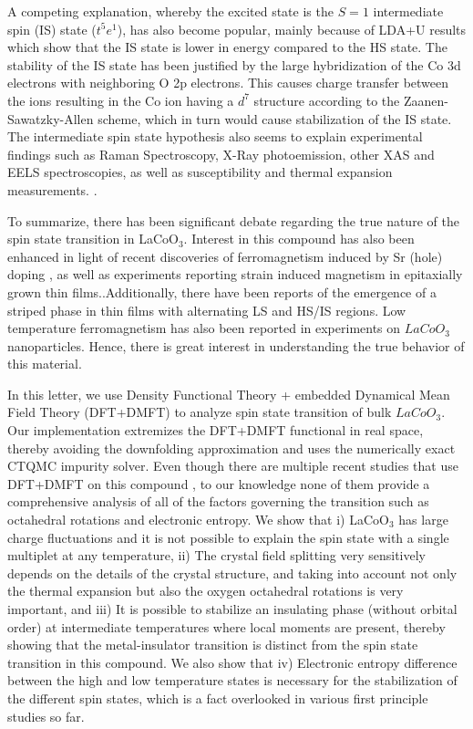 \documentclass[10pt]{ruthesis}
\begin{document}
{A competing explanation, whereby the excited state is the $S=1$ intermediate spin (IS) state ($t^5e^1$), has also become popular\cite{Heikes, Radaelli}, mainly because of LDA+U results which show that the    
IS state is lower in energy compared to the HS state.\cite{Korotin, Pandey, Anisimov} The stability of the IS state has been justified by the large hybridization of the Co 3d electrons with neighboring O 2p electrons. This causes charge transfer between the ions resulting in the Co ion having a $d^7$ structure according to the Zaanen-Sawatzky-Allen scheme,\cite{Zaanen} which in turn would cause stabilization of the IS state. The intermediate spin state hypothesis also seems to explain experimental findings such as Raman Spectroscopy, X-Ray photoemission, other XAS and EELS spectroscopies, as well as susceptibility and thermal expansion measurements. \cite{Saitoh, Abbate, Masuda, Klie, Zobel, Gne, Maris, Vogt}. 

To summarize, there has been significant debate regarding the true nature of the spin state transition in LaCoO$_3$. Interest in this compound has also been enhanced in light of recent discoveries of ferromagnetism induced by Sr (hole) doping \cite{Kriener, Masayuki, Kunes_doped,nemeth}, as well as experiments reporting strain induced magnetism in epitaxially grown thin films.\cite{Fuchs1, Fuchs2, Rondinelli, Freeland, Fuchs3, Herklotz,Hsu}.Additionally, there have been reports of the emergence of a striped phase in thin films with alternating LS and HS/IS regions.\cite{Striped}   Low temperature ferromagnetism has also been reported in experiments on $LaCoO_3$ nanoparticles\cite{Belanger1}. Hence, there is great interest in understanding the true behavior of this material. 

In this letter, we use Density Functional Theory + embedded Dynamical Mean Field Theory (DFT+DMFT)  to analyze spin state transition of bulk $LaCoO_3$.  Our implementation extremizes the DFT+DMFT functional in real space, thereby avoiding the downfolding approximation and uses the numerically exact CTQMC impurity solver\cite{Dmft3,haule}.  Even though there are multiple recent studies that use DFT+DMFT on this compound \cite{craco, Zhang, Kunes_main}, to our knowledge none of them provide a comprehensive analysis of all of the factors governing the transition such as octahedral rotations and electronic entropy. We show that i) LaCoO$_3$ has large charge fluctuations and it is not possible to explain the spin state with a single multiplet at any temperature, ii) The crystal field splitting very sensitively depends on the details of the crystal structure, and taking into account not only the thermal expansion but also the oxygen octahedral rotations is very important, and  iii) It is possible to stabilize an insulating phase (without orbital order) at intermediate temperatures where local moments are present, thereby showing that the metal-insulator transition is distinct from the spin state transition in this compound. We also show that  iv) Electronic entropy difference between the high and low temperature states is necessary for the stabilization of the different spin states, which is a fact overlooked in various first principle studies so far. 


}
\end{document}
